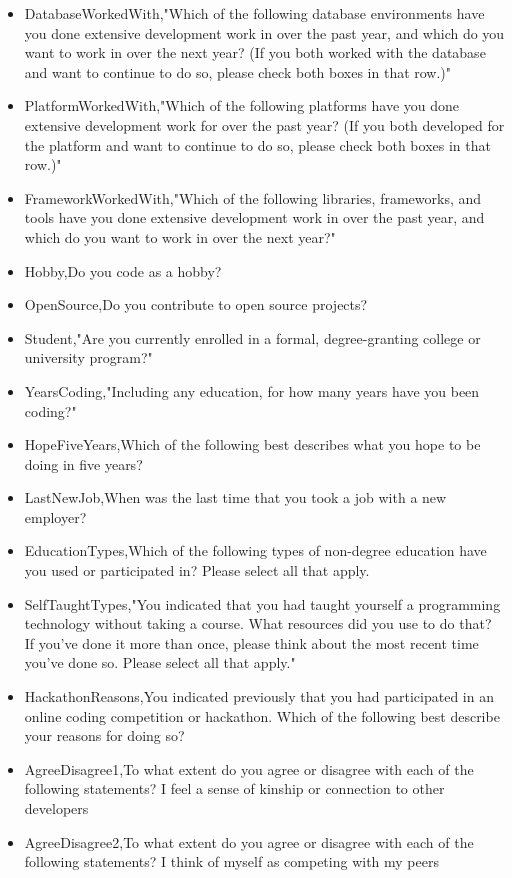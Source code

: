 \begin{appendices}
\begin{itemize}
        \item DatabaseWorkedWith,"Which of the following database environments have you done extensive development work in over the past year, and which do you want to work in over the next year?   (If you both worked with the database and want to continue to do so, please check both boxes in that row.)"
        \item PlatformWorkedWith,"Which of the following platforms have you done extensive development work for over the past year?   (If you both developed for the platform and want to continue to do so, please check both boxes in that row.)"
        \item FrameworkWorkedWith,"Which of the following libraries, frameworks, and tools have you done extensive development work in over the past year, and which do you want to work in over the next year?"
        \item Hobby,Do you code as a hobby?
        \item OpenSource,Do you contribute to open source projects?
        \item Student,"Are you currently enrolled in a formal, degree-granting college or university program?"
        \item YearsCoding,"Including any education, for how many years have you been coding?"
        \item HopeFiveYears,Which of the following best describes what you hope to be doing in five years?
        \item LastNewJob,When was the last time that you took a job with a new employer?
        \item EducationTypes,Which of the following types of non-degree education have you used or participated in? Please select all that apply.
        \item SelfTaughtTypes,"You indicated that you had taught yourself a programming technology without taking a course. What resources did you use to do that? If you’ve done it more than once, please think about the most recent time you’ve done so. Please select all that apply."
        \item HackathonReasons,You indicated previously that you had participated in an online coding competition or hackathon. Which of the following best describe your reasons for doing so?
        \item AgreeDisagree1,To what extent do you agree or disagree with each of the following statements? I feel a sense of kinship or connection to other developers
        \item AgreeDisagree2,To what extent do you agree or disagree with each of the following statements? I think of myself as competing with my peers

\end{itemize}
\end{appendices}

